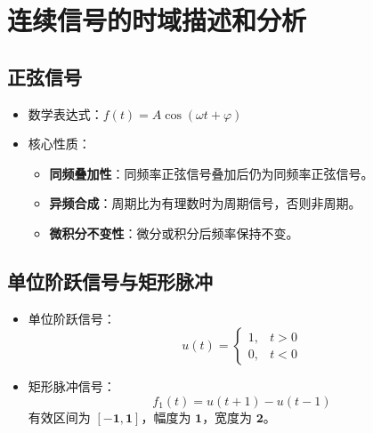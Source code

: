 \chapter{连续信号的时域描述和分析}

\section{正弦信号}
\begin{itemize}
\item 数学表达式：$f(t) = A\cos(\omega t + \varphi)$
\item 核心性质：
  \begin{itemize}
  \item \textbf{同频叠加性}：同频率正弦信号叠加后仍为同频率正弦信号。
  \item \textbf{异频合成}：周期比为有理数时为周期信号，否则非周期。
  \item \textbf{微积分不变性}：微分或积分后频率保持不变。
  \end{itemize}
\end{itemize}

\section{单位阶跃信号与矩形脉冲}
\begin{itemize}
\item 单位阶跃信号：
  \[
  u(t) = \begin{cases} 1, & t>0 \\ 0, & t<0 \end{cases}
  \]
\item 矩形脉冲信号：
  \[
  f_1(t)=u(t+1)-u(t-1)
  \]
  有效区间为 $\boldsymbol{[-1,1]}$，幅度为 $\boldsymbol{1}$，宽度为 $\boldsymbol{2}$。
\end{itemize}

